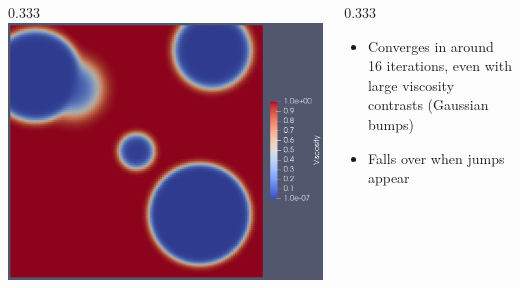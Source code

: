 \documentclass[presentation,aspectratio=43, 10pt]{beamer}
\begin{document}
\begin{frame}[fragile, t]
\begin{onlyenv}
\begin{columns}
\begin{column}{0.333\pagewidth}
        \includegraphics[width=\textwidth]{stokes-viscosity}
      \end{column}
      \begin{column}{0.333\pagewidth}
        \begin{itemize}
        \item Converges in around 16 iterations, even with large
          viscosity contrasts (Gaussian bumps)
        \item Falls over when jumps appear
        \end{itemize}
      \end{column}
    \end{columns}
  \end{onlyenv}
\end{frame}
\end{document}
